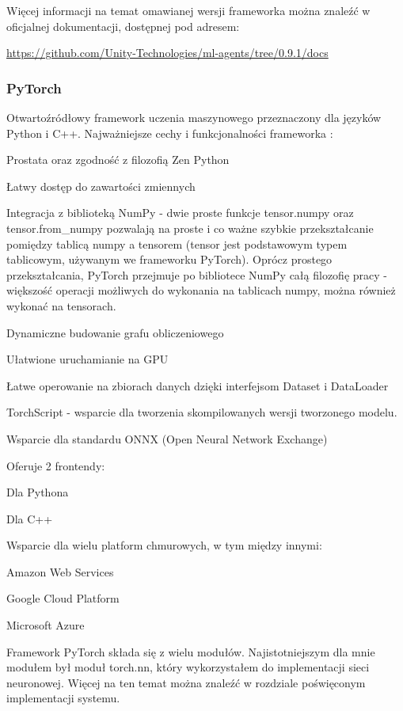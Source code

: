 Więcej informacji na temat omawianej wersji frameworka można znaleźć w oficjalnej dokumentacji, dostępnej pod adresem:
\begin{center}
\url{https://github.com/Unity-Technologies/ml-agents/tree/0.9.1/docs}
\end{center}

\subsubsection{PyTorch}
Otwartoźródłowy framework uczenia maszynowego przeznaczony dla języków Python i C++.
Najważniejsze cechy i funkcjonalności frameworka \cite{pytorch:features}\cite{pytorch:vs:tensorflow}:
\begin{enumerate*}
\item Prostata oraz zgodność z filozofią Zen Python \cite{python:zen}
\item Łatwy dostęp do zawartości zmiennych
\item Integracja z biblioteką NumPy - dwie proste funkcje tensor.numpy oraz tensor.from\_numpy pozwalają na proste i co ważne szybkie przekształcanie pomiędzy tablicą numpy a tensorem (tensor jest podstawowym typem tablicowym, używanym we frameworku PyTorch). Oprócz prostego przekształcania, PyTorch przejmuje po bibliotece NumPy całą filozofię pracy - większość operacji możliwych do wykonania na tablicach numpy, można również wykonać na tensorach.
\item Dynamiczne budowanie grafu obliczeniowego \cite{pytorch:understandingGraphs}
\item Ułatwione uruchamianie na GPU
\item Łatwe operowanie na zbiorach danych dzięki interfejsom Dataset i DataLoader
\item TorchScript - wsparcie dla tworzenia skompilowanych wersji tworzonego modelu.
\item Wsparcie dla standardu ONNX (Open Neural Network Exchange)
\item Oferuje 2 frontendy:
\begin{itemize*}
\item Dla Pythona
\item Dla C++
\end{itemize*}
\item Wsparcie dla wielu platform chmurowych, w tym między innymi:
\begin{itemize*}
\item Amazon Web Services
\item Google Cloud Platform
\item Microsoft Azure
\end{itemize*}
\end{enumerate*}
Framework PyTorch składa się z wielu modułów. Najistotniejszym dla mnie modułem był moduł torch.nn, który wykorzystałem do implementacji sieci neuronowej. Więcej na ten temat można znaleźć w rozdziale poświęconym implementacji systemu.

